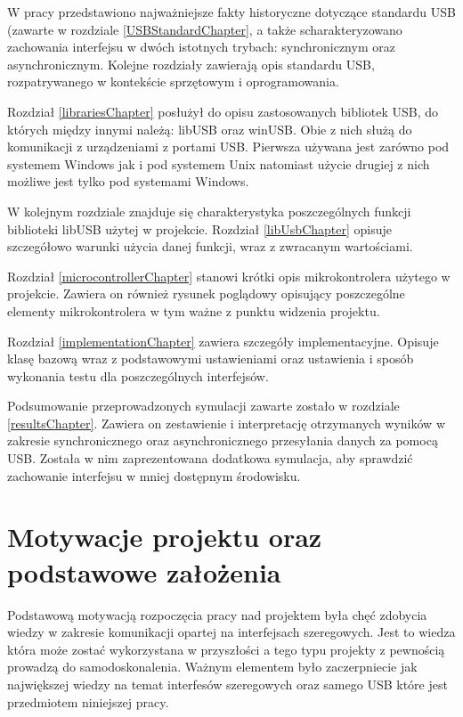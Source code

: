 \documentclass{BscUS}
\begin{document}
W pracy przedstawiono najważniejsze fakty historyczne dotyczące standardu USB (zawarte w rozdziale \ref{USBStandardChapter}, a także scharakteryzowano zachowania interfejsu w dwóch istotnych trybach: synchronicznym oraz asynchronicznym. Kolejne rozdziały zawierają opis standardu USB, rozpatrywanego w kontekście sprzętowym i oprogramowania.

Rozdział \ref{librariesChapter} posłużył do opisu zastosowanych bibliotek USB, do których między innymi należą: libUSB oraz winUSB. Obie z nich służą do komunikacji z urządzeniami z portami USB. Pierwsza używana jest zarówno pod systemem Windows jak i pod systemem Unix natomiast użycie drugiej z nich możliwe jest tylko pod systemami Windows.

W kolejnym rozdziale znajduje się charakterystyka poszczególnych funkcji biblioteki libUSB użytej w projekcie. Rozdział \ref{libUsbChapter} opisuje szczegółowo warunki użycia danej funkcji, wraz z zwracanym wartościami. 

Rozdział \ref{microcontrollerChapter} stanowi krótki opis mikrokontrolera użytego w projekcie. Zawiera on również rysunek poglądowy opisujący poszczególne elementy mikrokontrolera w tym ważne z punktu widzenia projektu.

Rozdział \ref{implementationChapter} zawiera szczegóły implementacyjne. Opisuje klasę bazową wraz z podstawowymi ustawieniami oraz ustawienia i sposób wykonania testu dla poszczególnych interfejsów.

Podsumowanie przeprowadzonych symulacji zawarte zostało w rozdziale \ref{resultsChapter}. Zawiera on zestawienie i interpretację otrzymanych wyników w zakresie synchronicznego oraz asynchronicznego przesyłania danych za pomocą USB. Została w nim zaprezentowana dodatkowa symulacja, aby sprawdzić zachowanie interfejsu w mniej dostępnym środowisku.
\fi

\chapter{Motywacje projektu oraz podstawowe założenia}
\label{ch:motivationAndBasics}
Podstawową motywacją rozpoczęcia pracy nad projektem była chęć zdobycia wiedzy w zakresie komunikacji opartej na interfejsach szeregowych. Jest to wiedza która może zostać wykorzystana w przyszłości a tego typu projekty z pewnością prowadzą do samodoskonalenia. Ważnym elementem było zaczerpniecie jak największej wiedzy na temat interfesów szeregowych oraz samego USB które jest przedmiotem niniejszej pracy.
\end{document}
